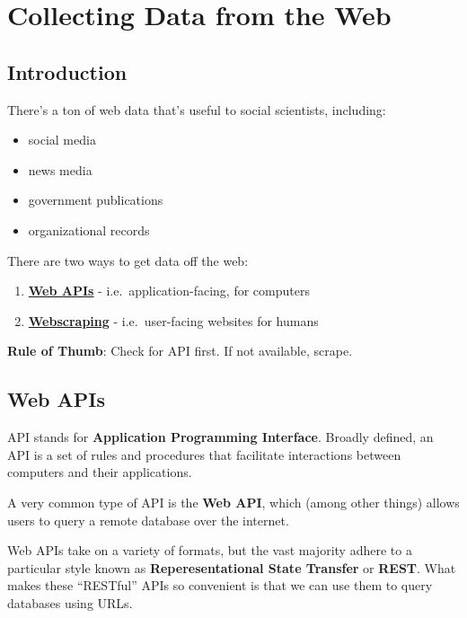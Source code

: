 \documentclass[]{book}
\providecommand{\tightlist}{%
  \setlength{\itemsep}{0pt}\setlength{\parskip}{0pt}}
\begin{document}
\hypertarget{collecting-data-from-the-web}{%
\chapter{Collecting Data from the Web}\label{collecting-data-from-the-web}}

\hypertarget{introduction-2}{%
\section{Introduction}\label{introduction-2}}

There's a ton of web data that's useful to social scientists, including:

\begin{itemize}
\tightlist
\item
  social media
\item
  news media
\item
  government publications
\item
  organizational records
\end{itemize}

There are two ways to get data off the web:

\begin{enumerate}
\def\labelenumi{\arabic{enumi}.}
\tightlist
\item
  \textbf{\protect\hyperlink{web-apis}{Web APIs}} - i.e.~application-facing, for computers
\item
  \textbf{\protect\hyperlink{webscraping}{Webscraping}} - i.e.~user-facing websites for humans
\end{enumerate}

\textbf{Rule of Thumb}: Check for API first. If not available, scrape.

\hypertarget{web-apis}{%
\section{Web APIs}\label{web-apis}}

API stands for \textbf{Application Programming Interface}. Broadly defined, an API is a set of rules and procedures that facilitate interactions between computers and their applications.

A very common type of API is the \textbf{Web API}, which (among other things) allows users to query a remote database over the internet.

Web APIs take on a variety of formats, but the vast majority adhere to a particular style known as \textbf{Reperesentational State Transfer} or \textbf{REST}. What makes these ``RESTful'' APIs so convenient is that we can use them to query databases using URLs.
\end{document}

